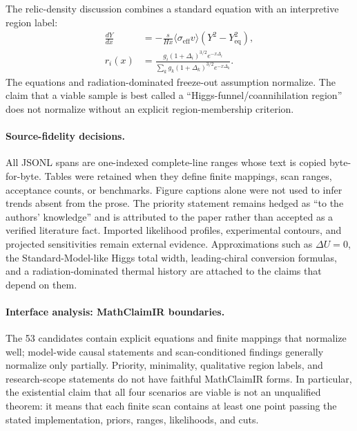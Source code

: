 The relic-density discussion combines a standard equation with an
interpretive region label:
\[
\begin{aligned}
 \frac{dY}{dx}
 &=-\frac{s}{Hx}\langle\sigma_{\mathrm{eff}}v\rangle
 \left(Y^2-Y_{\mathrm{eq}}^2\right),\\
 r_i(x)&=\frac{g_i(1+\Delta_i)^{3/2}e^{-x\Delta_i}}
 {\sum_k g_k(1+\Delta_k)^{3/2}e^{-x\Delta_k}}.
\end{aligned}
\]
The equations and radiation-dominated freeze-out assumption normalize. The
claim that a viable sample is best called a ``Higgs-funnel/coannihilation
region'' does not normalize without an explicit region-membership criterion.

\paragraph{Source-fidelity decisions.}
All JSONL spans are one-indexed complete-line ranges whose text is copied
byte-for-byte. Tables were retained when they define finite mappings, scan
ranges, acceptance counts, or benchmarks. Figure captions alone were not
used to infer trends absent from the prose. The priority statement remains
hedged as ``to the authors' knowledge'' and is attributed to the paper rather
than accepted as a verified literature fact. Imported likelihood profiles,
experimental contours, and projected sensitivities remain external evidence.
Approximations such as $\Delta U=0$, the Standard-Model-like Higgs total width,
leading-chiral conversion formulas, and a radiation-dominated thermal history
are attached to the claims that depend on them.

\paragraph{Interface analysis: MathClaimIR boundaries.}
The 53 candidates contain explicit equations and finite mappings that normalize
well; model-wide causal statements and scan-conditioned findings generally
normalize only partially. Priority, minimality, qualitative region labels,
and research-scope statements do not have faithful MathClaimIR forms. In
particular, the existential claim that all four scenarios are viable is not an
unqualified theorem: it means that each finite scan contains at least one point
passing the stated implementation, priors, ranges, likelihoods, and cuts.

